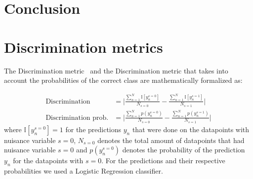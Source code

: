 \documentclass{article} %
\begin{document}
\section{Conclusion}







\newpage
\appendix

\section{Discrimination metrics}
The Discrimination metric~\citep{zemel2013learning} and the Discrimination metric that takes into account the probabilities of the correct class are mathematically formalized as:
 
\begin{align*}
 \text{Discrimination} & = \bigg|\frac{\sum_{n=1}^{N}\mathbb{I}[y_n^{s=0}]}{N_{s = 0}} - \frac{\sum_{n=1}^{N}\mathbb{I}[y_n^{s=1}]}{N_{s=1}}\bigg| \\  
  \text{Discrimination prob.} & = \bigg|\frac{\sum_{n=1}^{N}p(y_n^{s=0})}{N_{s = 0}} - \frac{\sum_{n=1}^{N}p(y_n^{s=1})}{N_{s=1}}\bigg|
\end{align*}
where $\mathbb{I}[y_n^{s=0}] = 1$ for the predictions $y_n$ that were done on the datapoints with nuisance variable $s = 0$, $N_{s=0}$ denotes the total amount of datapoints that had nuisance variable $s = 0$ and $p(y_n^{s=0})$ denotes the probability of the prediction $y_n$ for the datapoints with $s=0$. For the predictions and their respective probabilities we used a Logistic Regression classifier.
\end{document}
